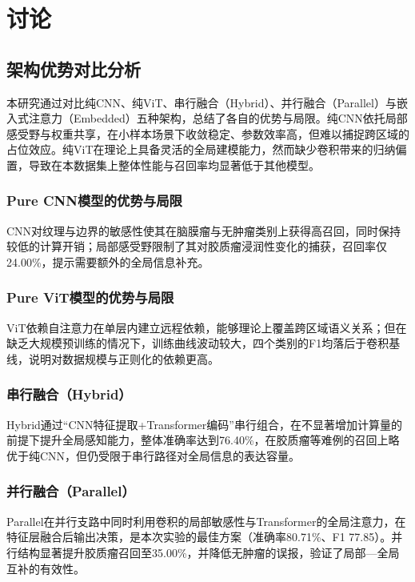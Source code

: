 \section{讨论}

\subsection{架构优势对比分析}

本研究通过对比纯CNN、纯ViT、串行融合（Hybrid）、并行融合（Parallel）与嵌入式注意力（Embedded）五种架构，总结了各自的优势与局限。纯CNN依托局部感受野与权重共享，在小样本场景下收敛稳定、参数效率高，但难以捕捉跨区域的占位效应。纯ViT在理论上具备灵活的全局建模能力，然而缺少卷积带来的归纳偏置，导致在本数据集上整体性能与召回率均显著低于其他模型。

\subsubsection{Pure CNN模型的优势与局限}

CNN对纹理与边界的敏感性使其在脑膜瘤与无肿瘤类别上获得高召回，同时保持较低的计算开销；局部感受野限制了其对胶质瘤浸润性变化的捕获，召回率仅24.00\%，提示需要额外的全局信息补充。

\subsubsection{Pure ViT模型的优势与局限}

ViT依赖自注意力在单层内建立远程依赖，能够理论上覆盖跨区域语义关系；但在缺乏大规模预训练的情况下，训练曲线波动较大，四个类别的F1均落后于卷积基线，说明对数据规模与正则化的依赖更高。

\subsubsection{串行融合（Hybrid）}

Hybrid通过“CNN特征提取+Transformer编码”串行组合，在不显著增加计算量的前提下提升全局感知能力，整体准确率达到76.40\%，在胶质瘤等难例的召回上略优于纯CNN，但仍受限于串行路径对全局信息的表达容量。

\subsubsection{并行融合（Parallel）}

Parallel在并行支路中同时利用卷积的局部敏感性与Transformer的全局注意力，在特征层融合后输出决策，是本次实验的最佳方案（准确率80.71\%、F1 77.85）。并行结构显著提升胶质瘤召回至35.00\%，并降低无肿瘤的误报，验证了局部—全局互补的有效性。

